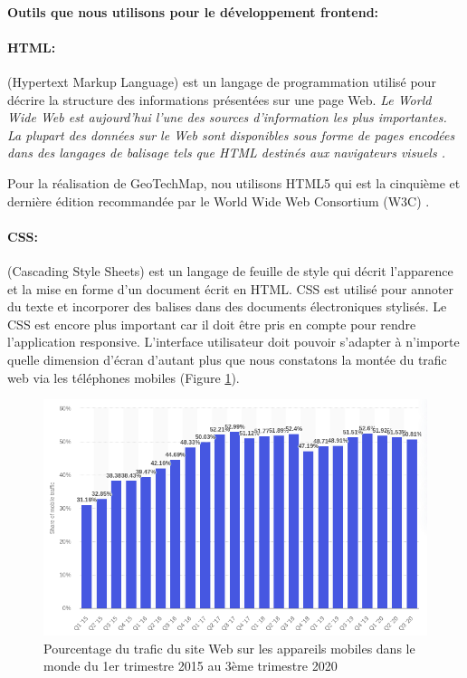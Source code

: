         \paragraph{Outils que nous utilisons pour le développement frontend:}
        \paragraph{HTML: }
        (Hypertext Markup Language) est un langage de programmation utilisé pour décrire 
        la structure des informations présentées sur une page Web. 
        \textit{Le World Wide Web est aujourd'hui l'une des sources d'information les plus 
        importantes. La plupart des données sur le Web sont disponibles sous forme de 
        pages encodées dans des langages de balisage tels que HTML destinés aux 
        navigateurs visuels \cite{yang2003html}.} 
        \par 
        Pour la réalisation de GeoTechMap, nou utilisons HTML5 qui est la cinquième et dernière 
        édition recommandée par le World Wide Web Consortium (W3C) \cite{brooks2010world}.
        \paragraph{CSS: }
         (Cascading Style Sheets) est un langage de feuille de style qui décrit 
        l'apparence et la mise en forme d'un document écrit en HTML. CSS est utilisé 
        pour annoter du texte et incorporer des balises dans des documents électroniques stylisés.
        Le CSS est encore plus important car il doit être pris en compte pour rendre l'application responsive.
        L'interface utilisateur doit pouvoir s'adapter à n'importe quelle dimension d'écran 
        d'autant plus que nous constatons la montée du trafic web via les téléphones mobiles (Figure \ref{fig:statMobile}).
        \begin{figure}[t]
                \centering
                \includegraphics[scale=0.5]{images/Implementation/statMobile.png}
                \caption{
                        Pourcentage du trafic du site Web sur les appareils 
                        mobiles dans le monde du 1er trimestre 2015 au 3ème trimestre 2020 \cite{linkstatmobile}}
                \label{fig:statMobile}
        \end{figure}
